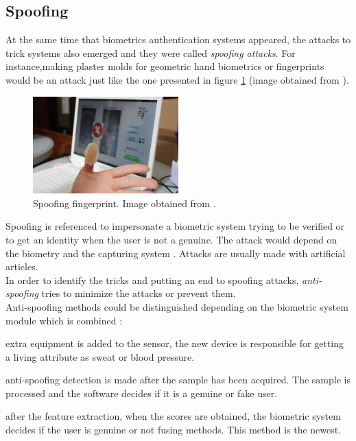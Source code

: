\subsection{Spoofing}
At the same time that biometrics authentication systems appeared, the attacks to trick systems also emerged and they were called \textit{spoofing attacks}. For instance,making plaster molds for geometric hand biometrics or fingerprints would be an attack just like the one presented in figure \ref{fig:Spoof_fingerprint} (image obtained from \cite{fingerprint_image}).\\

\begin{figure}[htb]
\centering
\includegraphics[width=0.5\textwidth]{images_miscelaneus/spoofing_fingerprint.jpg}
\caption{Spoofing fingerprint. Image obtained from \cite{fingerprint_image}.} \label{fig:Spoof_fingerprint}
\end{figure}

Spoofing is referenced to impersonate a biometric system trying to be verified or to get an identity when the user is not a genuine. The attack would depend on the biometry and the capturing system \cite{Spoofing_survey}. Attacks are usually made with artificial articles.\\
 
In order to identify the tricks and putting an end to  spoofing attacks, \textit{anti-spoofing} tries to minimize the attacks or prevent them.\\


Anti-spoofing methods could be distinguished depending on the biometric system module which is combined \cite{Spoofing_survey}:
\begin{description}[itemsep=2pt,topsep=8pt,parsep=0pt,partopsep=20pt]
\item[Sensor level:] extra equipment is added to the sensor, the new device is responsible for getting a living attribute as sweat or blood pressure.
\item[Feature level:] anti-spoofing detection is made after the sample has been acquired. The sample is processed and the software decides if it is a genuine or fake user.
\item[Score level:] after the feature extraction, when the scores are obtained, the biometric system decides if the user is genuine or not fusing methods. This method is the newest.
\end{description}

